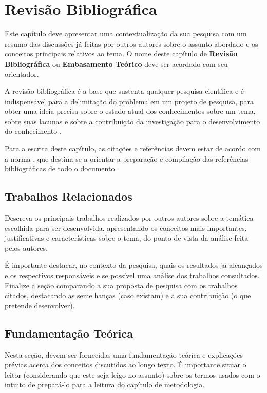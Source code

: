 \chapter{Revisão Bibliográfica} \label{RevisaoBibliografica}

Este capítulo deve apresentar uma contextualização da sua pesquisa com um resumo das discussões já feitas por outros autores sobre o assunto abordado e os conceitos principais relativos ao tema. O nome deste capítulo  de \textbf{Revisão Bibliográfica} ou \textbf{Embasamento Teórico} deve ser acordado com seu orientador.

A revisão bibliográfica é a base que sustenta qualquer pesquisa científica e  é indispensável para a delimitação do problema em um projeto de pesquisa,  para obter uma ideia precisa sobre o estado atual dos conhecimentos sobre um tema, sobre suas lacunas e sobre a contribuição da investigação para o desenvolvimento do conhecimento \cite{marconi2003}. 

Para a escrita deste capítulo, as citações e referências devem estar de acordo com a norma \cite{NBR6023:2002}, que destina-se a orientar a preparação e compilação das  referências bibliográficas de todo o documento.

\section{Trabalhos Relacionados}

Descreva os principais trabalhos realizados por outros autores sobre a temática escolhida para ser desenvolvida, apresentando os conceitos mais importantes, justificativas e características sobre o tema, do ponto de vista da análise feita pelos autores. 

É importante destacar, no contexto da pesquisa, quais os resultados já alcançados e os respectivos responsáveis e se possível uma análise  dos trabalhos consultados. Finalize a seção comparando a sua proposta de pesquisa com os trabalhos citados, destacando as semelhanças (caso existam) e a sua contribuição (o que pretende desenvolver).


\section{Fundamentação Teórica}

Nesta seção, devem ser fornecidas uma fundamentação teórica e explicações prévias acerca dos conceitos discutidos ao longo texto. É importante situar o leitor (considerando que este seja leigo no assunto) sobre os termos usados com o intuito de prepará-lo para a leitura do capítulo de metodologia.

